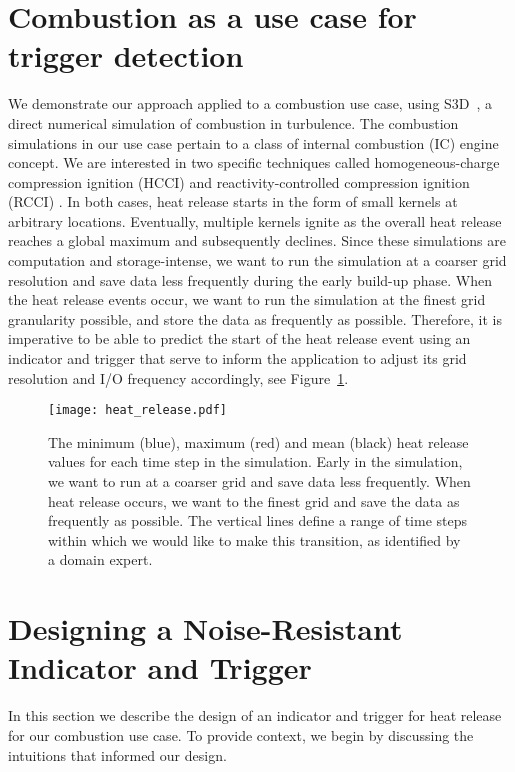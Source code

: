 \documentclass{sig-alternate}
\begin{document}
\section{Combustion as a use case for \\trigger detection}
We demonstrate our approach applied to a combustion
use case, using S3D~\cite{chen09}, a direct numerical simulation of 
combustion in turbulence.  
The combustion simulations in our use case pertain to a class of internal combustion
(IC) engine concept. 
We are interested in two specific techniques called homogeneous-charge compression
ignition (HCCI) \cite{bhagatwala1} and reactivity-controlled compression
ignition (RCCI) \cite{kokjohn,bhagatwala2}. In both cases, heat release
starts in the form of small kernels at arbitrary locations.  Eventually, multiple kernels 
ignite as the overall heat release reaches a global maximum and subsequently 
declines. Since these simulations are computation and storage-intense, 
we want to run the simulation at a coarser grid resolution and save data less 
frequently during the early build-up phase.  When the heat release events 
occur,  we want to run the simulation at the finest grid granularity possible, 
and store the data as frequently as possible.  Therefore, it is imperative to 
be able to predict the start of the heat release event using an indicator and 
trigger that serve to inform the application to adjust its grid resolution and 
I/O frequency accordingly, see Figure~\ref{fig:heat_release}. 

\begin{figure}[t]
\centering
\texttt{[image: heat\_release.pdf]}
\caption{\label{fig:heat_release} 
  The minimum (blue), maximum (red) and mean (black) heat release values
  for each time step in the simulation. Early in the simulation,
  we want to run at a coarser grid  and save data less frequently.
  When heat release occurs, we want to the finest grid and save the data as frequently as possible.  The vertical lines define a range of time steps within which we would like to make
  this transition, as identified by a domain expert.
}
\end{figure}

\section{Designing a Noise-Resistant \\Indicator and Trigger} 
\label{sec:indicator_trigger}
In this section we describe the design of an indicator and trigger for heat release for our combustion use case.   To provide context, we begin by discussing the intuitions that informed our design.
\end{document}
